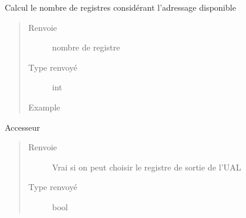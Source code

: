 \documentclass[letterpaper,10pt,french]{sphinxmanual}
\begin{document}
\begin{fulllineitems}
\begin{fulllineitems}
\begin{quote}
\begin{description}
\end{description}\end{quote}

\end{fulllineitems}


\begin{fulllineitems}
\label{\detokenize{processorengine:processorengine.ProcessorEngine.registersNumber}}
Calcul le nombre de registres considérant l’adressage disponible
\begin{quote}\begin{description}
\item[{Renvoie}] \leavevmode
nombre de registre

\item[{Type renvoyé}] \leavevmode
int

\item[{Example}] \leavevmode
\begin{sphinxVerbatim}[commandchars=\\\{\}]
\end{sphinxVerbatim}

\end{description}\end{quote}

\end{fulllineitems}


\begin{fulllineitems}
\label{\detokenize{processorengine:processorengine.ProcessorEngine.ualOutputIsFree}}
Accesseur
\begin{quote}\begin{description}
\item[{Renvoie}] \leavevmode
Vrai si on peut choisir le registre de sortie de l’UAL

\item[{Type renvoyé}] \leavevmode
bool


\end{description}
\end{quote}
\end{fulllineitems}
\end{fulllineitems}
\end{document}
